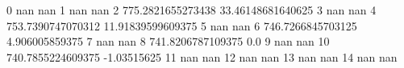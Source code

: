 0 nan nan
1 nan nan
2 775.2821655273438 33.46148681640625
3 nan nan
4 753.7390747070312 11.91839599609375
5 nan nan
6 746.7266845703125 4.906005859375
7 nan nan
8 741.8206787109375 0.0
9 nan nan
10 740.7855224609375 -1.03515625
11 nan nan
12 nan nan
13 nan nan
14 nan nan
